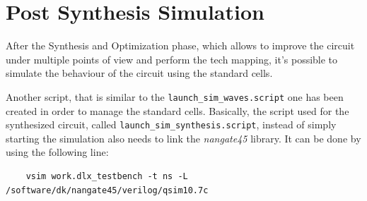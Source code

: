 \section{Post Synthesis Simulation}
After the Synthesis and Optimization phase, which allows to improve the circuit under multiple points of view and perform the tech mapping, it's possible to simulate the behaviour of the circuit using the standard cells.

Another script, that is similar to the \texttt{launch\_sim\_waves.script} one has been created in order to manage the standard cells. Basically, the script used for the synthesized circuit, called \texttt{launch\_sim\_synthesis.script}, instead of simply starting the simulation also needs to link the \textit{nangate45} library. It can be done by using the following line:
\begin{lstlisting}
    vsim work.dlx_testbench -t ns -L /software/dk/nangate45/verilog/qsim10.7c 
\end{lstlisting}
